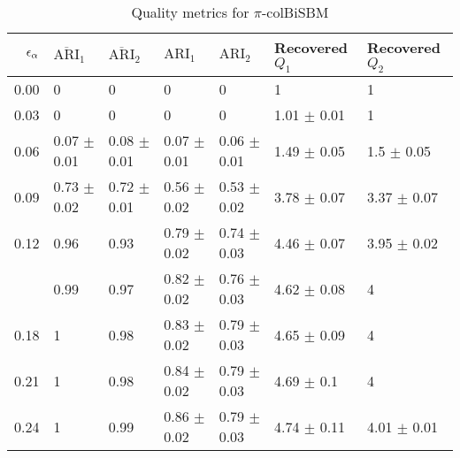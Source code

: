 \begin{table}[!h]

\caption{\label{tab:per_model_table}\label{tab:per_model_pi}Quality metrics for $\pi$-colBiSBM}
\centering
\begin{tabular}[t]{rllllll}
\toprule
$\eps[\alpha]$ & $\overline{\text{ARI}}_{1}$ & $\overline{\text{ARI}}_{2}$ & $\text{ARI}_{1}$ & $\text{ARI}_{2}$ & Recovered $Q_1$ & Recovered $Q_2$\\
\midrule
0.00 & 0 & 0 & 0 & 0 & 1 & 1\\
0.03 & 0 & 0 & 0 & 0 & 1.01 $\pm$ 0.01 & 1\\
0.06 & 0.07 $\pm$ 0.01 & 0.08 $\pm$ 0.01 & 0.07 $\pm$ 0.01 & 0.06 $\pm$ 0.01 & 1.49 $\pm$ 0.05 & 1.5 $\pm$ 0.05\\
0.09 & 0.73 $\pm$ 0.02 & 0.72 $\pm$ 0.01 & 0.56 $\pm$ 0.02 & 0.53 $\pm$ 0.02 & 3.78 $\pm$ 0.07 & 3.37 $\pm$ 0.07\\
0.12 & 0.96 & 0.93 & 0.79 $\pm$ 0.02 & 0.74 $\pm$ 0.03 & 4.46 $\pm$ 0.07 & 3.95 $\pm$ 0.02\\
\addlinespace
0.15 & 0.99 & 0.97 & 0.82 $\pm$ 0.02 & 0.76 $\pm$ 0.03 & 4.62 $\pm$ 0.08 & 4\\
0.18 & 1 & 0.98 & 0.83 $\pm$ 0.02 & 0.79 $\pm$ 0.03 & 4.65 $\pm$ 0.09 & 4\\
0.21 & 1 & 0.98 & 0.84 $\pm$ 0.02 & 0.79 $\pm$ 0.03 & 4.69 $\pm$ 0.1 & 4\\
0.24 & 1 & 0.99 & 0.86 $\pm$ 0.02 & 0.79 $\pm$ 0.03 & 4.74 $\pm$ 0.11 & 4.01 $\pm$ 0.01\\
\bottomrule
\end{tabular}
\end{table}
